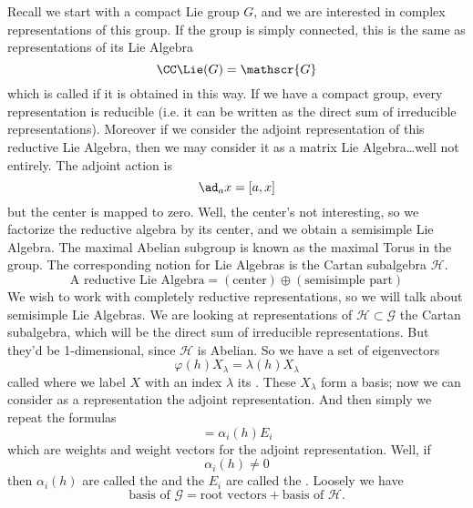 Recall we start with a compact Lie group $G$, and we are
interested in complex representations of this group. If the group
is simply connected, this is the same as representations of its
Lie Algebra
\begin{equation}
\CC\Lie(G)=\mathscr{G}
\end{equation}
which is called  if it is obtained in this way.
If we have a compact group, every representation is reducible
(i.e. it can be written as the direct sum of irreducible
representations). Moreover if we consider the adjoint
representation of this reductive Lie Algebra, then we may
consider it as a matrix Lie Algebra\dots{}well not entirely. The
adjoint action is
\begin{equation}
\ad_{a}x=[a,x]
\end{equation}
but the center is mapped to zero. Well, the center's not
interesting, so we factorize the reductive algebra by its center,
and we obtain a semisimple Lie Algebra. The maximal Abelian
subgroup is known as the maximal Torus in the group. The
corresponding notion for Lie Algebras is the Cartan subalgebra
$\mathscr{H}$.
\begin{equation}
\mbox{A reductive Lie Algebra}=(\mbox{center})\oplus(\mbox{semisimple part})
\end{equation}
We wish to work with completely reductive representations, so we
will talk about semisimple Lie Algebras. We are looking at
representations of $\mathscr{H}\subset\mathscr{G}$ the Cartan
subalgebra, which will be the direct sum of irreducible
representations. But they'd be 1-dimensional, since
$\mathscr{H}$ is Abelian. So we have a set of eigenvectors
\begin{equation}
\varphi(h)X_{\lambda} = \lambda(h)X_{\lambda}
\end{equation}
called  where we label $X$ with an index
$\lambda$ its . These $X_{\lambda}$ form a basis;
now we can consider as a representation the adjoint
representation. And then simply we repeat the formulas
\begin{equation}
[h,E_{i}] = \alpha_{i}(h)E_{i}
\end{equation}
which are weights and weight vectors for the adjoint
representation. Well, if
\begin{equation}
\alpha_{i}(h)\not=0
\end{equation}
then $\alpha_{i}(h)$ are called the  and the
$E_{i}$ are called the . Loosely we have
\begin{equation}
\mbox{basis of }\mathscr{G}=\mbox{root vectors}+\mbox{basis of }\mathscr{H}.
\end{equation}

